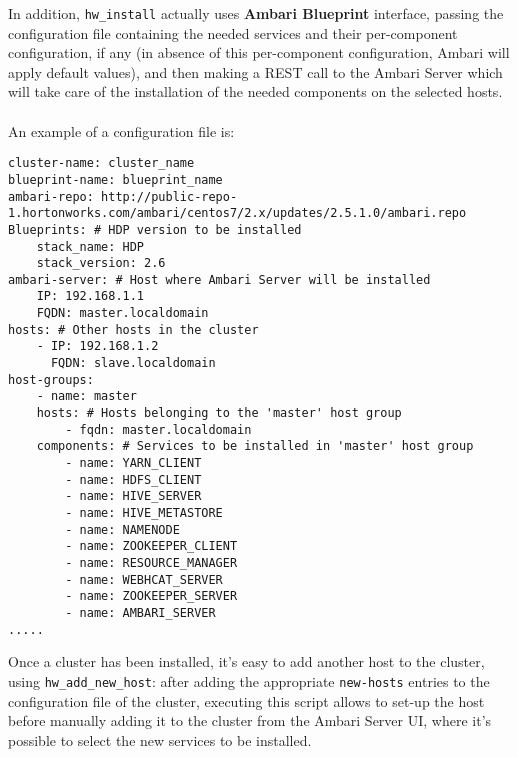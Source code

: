 In addition, \texttt{hw\_install} actually uses \textbf{Ambari Blueprint} interface, passing the configuration file containing the needed services and their per-component configuration, if any (in absence of this per-component configuration, Ambari will apply default values), and then making a REST call to the Ambari Server which will take care of the installation of the needed components on the selected hosts.
\\\\
An example of a configuration file is:

\begin{verbatim}
cluster-name: cluster_name
blueprint-name: blueprint_name
ambari-repo: http://public-repo-1.hortonworks.com/ambari/centos7/2.x/updates/2.5.1.0/ambari.repo
Blueprints: # HDP version to be installed
    stack_name: HDP
    stack_version: 2.6
ambari-server: # Host where Ambari Server will be installed
    IP: 192.168.1.1
    FQDN: master.localdomain
hosts: # Other hosts in the cluster
    - IP: 192.168.1.2
      FQDN: slave.localdomain
host-groups:
    - name: master
    hosts: # Hosts belonging to the 'master' host group
        - fqdn: master.localdomain
    components: # Services to be installed in 'master' host group
        - name: YARN_CLIENT
        - name: HDFS_CLIENT
        - name: HIVE_SERVER
        - name: HIVE_METASTORE
        - name: NAMENODE
        - name: ZOOKEEPER_CLIENT
        - name: RESOURCE_MANAGER
        - name: WEBHCAT_SERVER
        - name: ZOOKEEPER_SERVER
        - name: AMBARI_SERVER
.....
\end{verbatim}

Once a cluster has been installed, it's easy to add another host to the cluster, using \texttt{hw\_add\_new\_host}: after adding the appropriate \texttt{new-hosts} entries to the configuration file of the cluster, executing this script allows to set-up the host before manually adding it to the cluster from the Ambari Server UI, where it's possible to select the new services to be installed.
